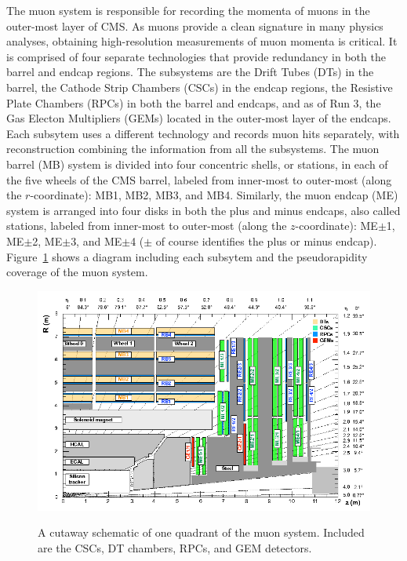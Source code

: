 The muon system \cite{MuonTDR} is responsible for recording the momenta of muons in the outer-most layer of CMS. As muons provide a clean signature in many physics analyses, obtaining high-resolution measurements of muon momenta is critical. It is comprised of four separate technologies that provide redundancy in both the barrel and endcap regions. The subsystems are the Drift Tubes (DTs) in the barrel, the Cathode Strip Chambers (CSCs) in the endcap regions, the Resistive Plate Chambers (RPCs) in both the barrel and endcaps, and as of Run 3, the Gas Electon Multipliers (GEMs) located in the outer-most layer of the endcaps. Each subsytem uses a different technology and records muon hits separately, with reconstruction combining the information from all the subsystems. The muon barrel (MB) system is divided into four concentric shells, or stations, in each of the five wheels of the CMS barrel, labeled from inner-most to outer-most (along the $r$-coordinate): MB1, MB2, MB3, and MB4. Similarly, the muon endcap (ME) system is arranged into four disks in both the plus and minus endcaps, also called stations, labeled from inner-most to outer-most (along the $z$-coordinate): ME$\pm$1, ME$\pm$2, ME$\pm$3, and ME$\pm$4 ($\pm$ of course identifies the plus or minus endcap). Figure~\ref{fig:MuonSystem} shows a diagram including each subsytem and the pseudorapidity coverage of the muon system.

\begin{figure}[H]
    \centering
    {\includegraphics[width=1\textwidth]{Images/CMS/MuonSystem.png}}
    \caption{A cutaway schematic of one quadrant of the muon system. Included are the CSCs, DT chambers, RPCs, and GEM detectors.}
    \label{fig:MuonSystem}
\end{figure}

